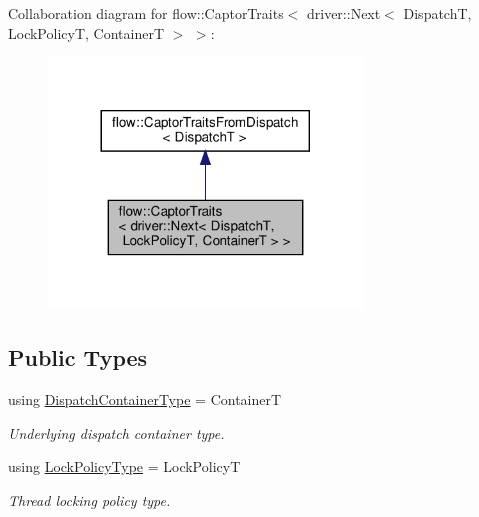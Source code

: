 Collaboration diagram for flow\+:\+:Captor\+Traits$<$ driver\+:\+:Next$<$ DispatchT, Lock\+PolicyT, ContainerT $>$ $>$\+:
\nopagebreak
\begin{figure}[H]
\begin{center}
\leavevmode
\includegraphics[width=236pt]{structflow_1_1_captor_traits_3_01driver_1_1_next_3_01_dispatch_t_00_01_lock_policy_t_00_01_container_t_01_4_01_4__coll__graph}
\end{center}
\end{figure}
\subsection*{Public Types}
\begin{DoxyCompactItemize}
\item 
\mbox{\label{structflow_1_1_captor_traits_3_01driver_1_1_next_3_01_dispatch_t_00_01_lock_policy_t_00_01_container_t_01_4_01_4_a59438191776c122c7ebca696f38ab9bb}} 
using \hyperlink{structflow_1_1_captor_traits_3_01driver_1_1_next_3_01_dispatch_t_00_01_lock_policy_t_00_01_container_t_01_4_01_4_a59438191776c122c7ebca696f38ab9bb}{Dispatch\+Container\+Type} = ContainerT
\begin{DoxyCompactList}\small\item\em Underlying dispatch container type. \end{DoxyCompactList}\item 
\mbox{\label{structflow_1_1_captor_traits_3_01driver_1_1_next_3_01_dispatch_t_00_01_lock_policy_t_00_01_container_t_01_4_01_4_accd5a679c5ab27623e678f54557fbe78}} 
using \hyperlink{structflow_1_1_captor_traits_3_01driver_1_1_next_3_01_dispatch_t_00_01_lock_policy_t_00_01_container_t_01_4_01_4_accd5a679c5ab27623e678f54557fbe78}{Lock\+Policy\+Type} = Lock\+PolicyT
\begin{DoxyCompactList}\small\item\em Thread locking policy type. \end{DoxyCompactList}\end{DoxyCompactItemize}


